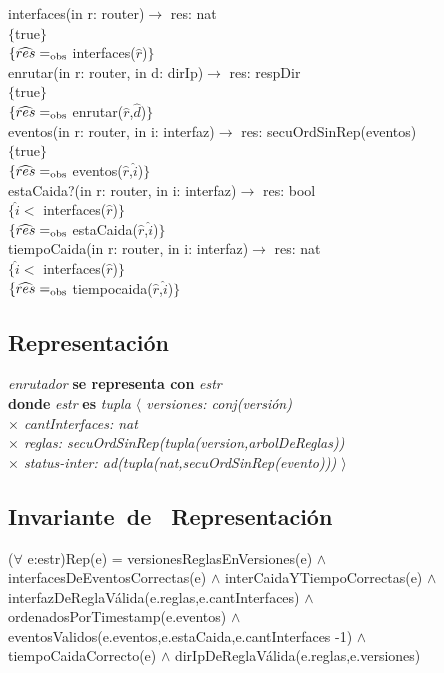 interfaces(in r: router)$\longrightarrow$ res: nat\\
$\{$true$\}$\\
$\{\widehat{res} =_{\mathrm{obs}}$ interfaces($\widehat{r}$)$\}$\\

enrutar(in r: router, in d: dirIp)$\longrightarrow$ res: respDir\\
$\{$true$\}$\\
$\{\widehat{res} =_{\mathrm{obs}}$ enrutar($\widehat{r}$,$\widehat{d}$)$\}$\\

eventos(in r: router, in i: interfaz)$\longrightarrow$ res: secuOrdSinRep(eventos)\\
$\{$true$\}$\\
$\{\widehat{res} =_{\mathrm{obs}}$ eventos($\widehat{r}$,$\widehat{i}$)$\}$\\

estaCaida?(in r: router, in i: interfaz)$\longrightarrow$ res: bool\\
$\{\widehat{i} <$ interfaces($\widehat{r}$)$\}$\\
$\{\widehat{res} =_{\mathrm{obs}}$ estaCaida($\widehat{r}$,$\widehat{i}$)$\}$\\

tiempoCaida(in r: router, in i: interfaz)$\longrightarrow$ res: nat\\
$\{\widehat{i} <$ interfaces($\widehat{r}$)$\}$\\
$\{\widehat{res} =_{\mathrm{obs}}$ tiempocaida($\widehat{r}$,$\widehat{i}$)$\}$\\


\subsection*{Representaci\'on}
\textit{enrutador} \textbf{se representa con} \textit{estr}\\
\textbf{donde} \textit{estr} \textbf{es} \textit{tupla $\langle$ versiones: conj(versi\'on)\\
\hspace*{3.5cm} $\times$  cantInterfaces: nat\\
\hspace*{3.5cm} $\times$  reglas: secuOrdSinRep(tupla(version,arbolDeReglas))\\ 
\hspace*{3.5cm} $\times$  status-inter: ad(tupla(nat,secuOrdSinRep(evento))) $\rangle$}


\subsection*{Invariante\ de \ Representaci\'on}
\textbf{} 
($\forall$ e:estr)Rep(e) = 
versionesReglasEnVersiones(e)
$\wedge$ interfacesDeEventosCorrectas(e)
$\wedge$ interCaidaYTiempoCorrectas(e) 
$\wedge$ interfazDeReglaV\'alida(e.reglas,e.cantInterfaces)
$\wedge$ ordenadosPorTimestamp(e.eventos)
$\wedge$ eventosValidos(e.eventos,e.estaCaida,e.cantInterfaces -1)
$\wedge$ tiempoCaidaCorrecto(e)  
$\wedge$ dirIpDeReglaV\'alida(e.reglas,e.versiones)\\

